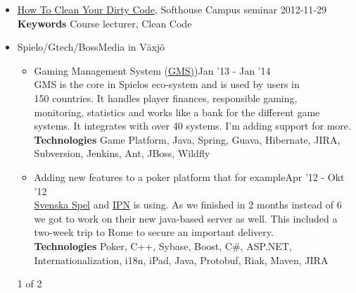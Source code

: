 \documentclass[overlapped]{res}
\begin{document}
\begin{resume}
\begin{itemize}
\item \href{https://github.com/jontejj/how-to-clean-your-dirty-code}{How To Clean Your Dirty Code}, Softhouse Campus seminar	\hfill 2012-11-29
	\\{\bf Keywords} Course lecturer, Clean Code
\\
\item Spielo/Gtech/BossMedia in Växjö
	\begin{itemize}
	\itemsep -1pt
	\item Gaming Management System (\href{http://www.spielog2.com/products/spielo-g2-gaming-management-system-(gms).aspx}{GMS)})\hfill Jan '13 - Jan '14
		\\GMS is the core in Spielos eco-system and is used  by users in
		\\150 countries. It handles player finances, responsible gaming,
		\\monitoring, statistics and works like a bank for the different game 
		\\systems. It integrates with over 40 systems. I'm adding support for more.  
		\\{\bf Technologies} Game Platform, Java, Spring, Guava, Hibernate, JIRA, 
		\\Subversion, Jenkins, Ant, JBoss, Wildfly
	\itemsep -1pt
	\item Adding new features to a poker platform that for example\hfill Apr '12 - Okt '12 
	\\\href{http://www.svenskaspel.se/poker}{Svenska Spel} and \href{http://www.ipnpoker.com/}{IPN} is using. As we 	finished in 2 months instead of 6 
	\\we got to work on their new java-based server as well. This included a \\two-week trip to Rome to secure an important 	delivery.	
	\\{\bf Technologies} Poker, C++, Sybase, Boost, C\#, ASP.NET, 
	\\Internationalization, i18n, iPad, Java, Protobuf, Riak, Maven, JIRA
	\end{itemize}
\vspace{0.8cm}
\centerline{1 of 2}
\newpage


\end{itemize}
\end{resume}
\end{document}
